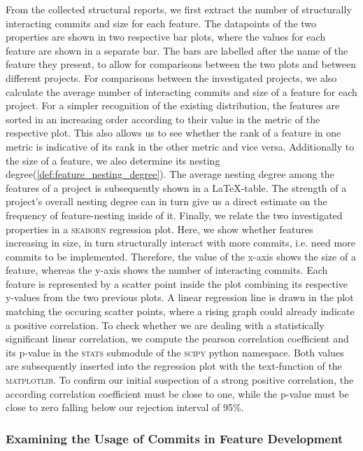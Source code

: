 From the collected structural reports, we first extract the number of structurally interacting commits and size for each feature.
The datapoints of the two properties are shown in two respective bar plots, where the values for each feature are shown in a separate bar.
The bars are labelled after the name of the feature they present, to allow for comparisons between the two plots and between different projects.
For comparisons between the investigated projects, we also calculate the average number of interacting commits and size of a feature for each project.
For a simpler recognition of the existing distribution, the features are sorted in an increasing order according to their value in the metric of the respective plot.
This also allows us to see whether the rank of a feature in one metric is indicative of its rank in the other metric and vice versa.
Additionally to the size of a feature, we also determine its nesting degree(\ref{def:feature_nesting_degree}).
The average nesting degree among the features of a project is subsequently shown in a \LaTeX-table.
The strength of a project's overall nesting degree can in turn give us a direct estimate on the frequency of feature-nesting inside of it.
Finally, we relate the two investigated properties in a \textsc{seaborn} regression plot.
Here, we show whether features increasing in size, in turn structurally interact with more commits, i.e. need more commits to be implemented.
Therefore, the value of the x-axis shows the size of a feature, whereas the y-axis shows the number of interacting commits.
Each feature is represented by a scatter point inside the plot combining its respective y-values from the two previous plots.
A linear regression line is drawn in the plot matching the occuring scatter points, where a rising graph could already indicate a positive correlation.
To check whether we are dealing with a statistically significant linear correlation, we compute the pearson correlation coefficient and its p-value in the \textsc{stats} submodule of the \textsc{scipy} python namespace.
Both values are subsequently inserted into the regression plot with the text-function of the \textsc{matplotlib}.
To confirm our initial suspection of a strong positive correlation, the according correlation coefficient must be close to one, while the p-value must be close to zero falling below our rejection interval of 95\%.

\subsubsection*{Examining the Usage of Commits in Feature Development}

